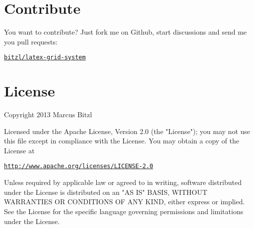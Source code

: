 \documentclass[DIV13]{scrartcl}
\begin{document}
\section{Contribute}
You want to contribute? Just fork me on Github, start discussions and send me you pull requests: 
\begin{center}
	\href{https://github.com/bitzl/latex-grid-system}{\tt bitzl/latex-grid-system}
\end{center}
	


\section{License}
Copyright 2013 Marcus Bitzl

\medskip

Licensed under the Apache License, Version 2.0 (the "License");
you may not use this file except in compliance with the License.
You may obtain a copy of the License at

\medskip

\hspace*{1.2em}\href{http://www.apache.org/licenses/LICENSE-2.0}{\texttt{http://www.apache.org/licenses/LICENSE-2.0}}

\medskip

Unless required by applicable law or agreed to in writing, software
distributed under the License is distributed on an "AS IS" BASIS,
WITHOUT WARRANTIES OR CONDITIONS OF ANY KIND, either express or implied.
See the License for the specific language governing permissions and
limitations under the License.
\end{document}
